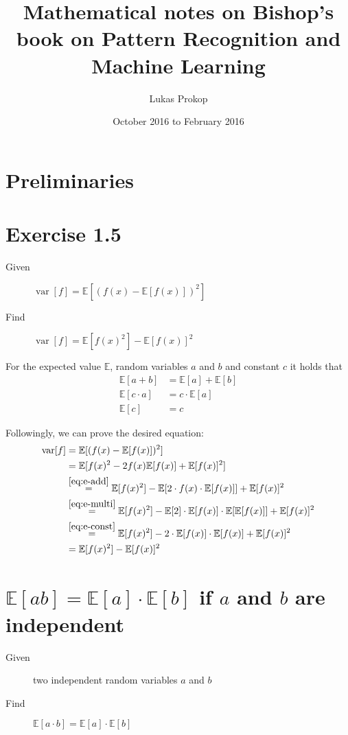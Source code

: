 \documentclass[a4paper]{article}
\title{Mathematical notes on Bishop's book on Pattern Recognition and Machine Learning}
\author{Lukas Prokop}
\date{October 2016 to February 2016}
\newcommand\E{\mathbb{E}}
\DeclareMathOperator\var{var}
\begin{document}
\maketitle
\tableofcontents
\clearpage

\section{Preliminaries}

\section{Exercise 1.5}

\begin{description}
  \item[Given] $\var[f] = \E[(f(x) - \E[f(x)])^2]$
  \item[Find] $\var[f] = \E[f(x)^2] - \E[f(x)]^2$
\end{description}

For the expected value $\E$, random variables $a$ and $b$ and constant $c$ it holds that
\begin{align}
  \E[a+b] &= \E[a] + \E[b]       \label{eq:e-add} \\
  \E[c \cdot a] &= c \cdot \E[a] \label{eq:e-multi} \\
  \E[c] &= c                     \label{eq:e-const}
\end{align}

Followingly, we can prove the desired equation:
\begin{align*}
  \var[f] &= \E[(f(x) - \E[f(x)])^2] \\
          &= \E[f(x)^2 - 2f(x) \E[f(x)] + \E[f(x)]^2] \\
          &\overset{\eqref{eq:e-add}}{=} \E[f(x)^2] - \E[2 \cdot f(x) \cdot \E[f(x)]] + \E[f(x)]^2 \\
          &\overset{\eqref{eq:e-multi}}{=} \E[f(x)^2] - \E[2] \cdot \E[f(x)] \cdot \E[\E[f(x)]] + \E[f(x)]^2 \\
          &\overset{\eqref{eq:e-const}}{=} \E[f(x)^2] - 2 \cdot \E[f(x)] \cdot \E[f(x)] + \E[f(x)]^2 \\
          &= \E[f(x)^2] - \E[f(x)]^2
\end{align*}

\section{$\E[ab] = \E[a] \cdot \E[b]$ if $a$ and $b$ are independent}
%
\begin{description}
  \item[Given] two independent random variables $a$ and $b$
  \item[Find] $\E[a \cdot b] = \E[a] \cdot \E[b]$
\end{description}
\end{document}
